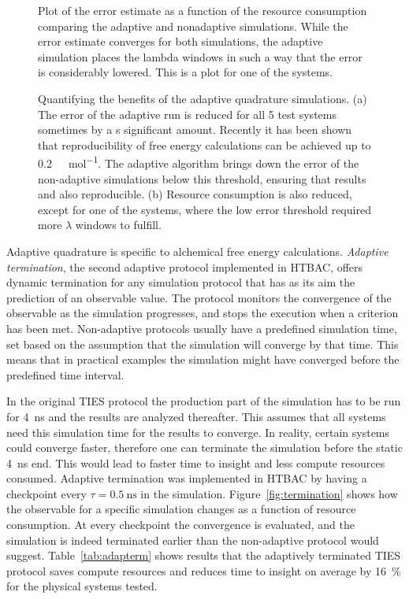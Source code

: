 \begin{figure}
  
  \caption{Plot of the error estimate as a function of the resource
  consumption comparing the adaptive and nonadaptive simulations. While the
  error estimate converges for both simulations, the adaptive simulation
  places the lambda windows in such a way that the error is considerably
  lowered. This is a plot for one of the systems.}
\label{fig:adapconv}
\end{figure}

\begin{figure}
  
  \caption{Quantifying the benefits of the adaptive quadrature simulations. (a)
  The error of the adaptive run is reduced for all 5 test systems sometimes by a
  s significant amount. Recently \cite{Loeffler2018} it has been shown that
  reproducibility of free energy calculations can be achieved up to
  \SI{0.2}{\kilo\calorie\per\mole}. The adaptive algorithm brings down the error
  of the non-adaptive simulations below this threshold, ensuring that results
  and also reproducible. (b) Resource consumption is also reduced, except for
  one of the systems, where the low error threshold required more $\lambda$
  windows to fulfill.}
  \label{fig:savings}
\end{figure}

Adaptive quadrature is specific to alchemical free energy calculations.
\emph{Adaptive termination}, the second adaptive protocol implemented in
HTBAC, offers dynamic termination for any simulation protocol that has as its
aim the prediction of an observable value. The protocol monitors the
convergence of the observable as the simulation progresses, and stops the
execution when a criterion has been met. Non-adaptive protocols usually have
a predefined simulation time, set based on the assumption that the simulation
will converge by that time. This means that in practical examples the
simulation might have converged before the predefined time interval.

In the original TIES protocol the production part of the simulation has to be
run for \SI{4}{\nano\second} and the results are analyzed thereafter. This
assumes that all systems need this simulation time for the results to converge.
In reality, certain systems could converge faster, therefore one can terminate
the simulation before the static \SI{4}{\nano\second} end. This would lead to
faster time to insight and less compute resources consumed. Adaptive termination
was implemented in HTBAC by having a checkpoint every $\tau =
\SI{0.5}{\nano\second}$ in the simulation. Figure~\ref{fig:termination} shows
how the observable for a specific simulation changes as a function of resource
consumption. At every checkpoint the convergence is evaluated, and the
simulation is indeed terminated earlier than the non-adaptive protocol would
suggest. Table~\ref{tab:adapterm} shows results that the adaptively terminated
TIES protocol saves compute resources and reduces time to insight on average by
\SI{16}{\percent} for the physical systems tested.


